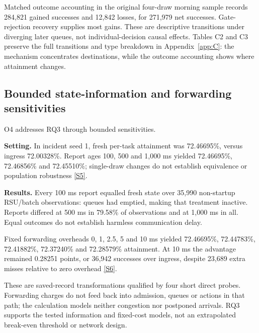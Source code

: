\documentclass[12pt,a4paper]{article}
\begin{document}
Matched outcome accounting in the original four-draw morning sample records 284,821 gained successes and 12,842 losses, for 271,979 net successes. Gate-rejection recovery supplies most gains. These are descriptive transitions under diverging later queues, not individual-decision causal effects. Tables C2 and C3 preserve the full transitions and type breakdown in Appendix~\ref{app:C}: the mechanism concentrates destinations, while the outcome accounting shows where attainment changes.

\FloatBarrier
\subsection{Bounded state-information and forwarding sensitivities}\label{sec:3.6}

O4 addresses RQ3 through bounded sensitivities.

\textbf{Setting.} In incident seed 1, fresh per-task attainment was 72.46695\%, versus ingress 72.00328\%. Report ages 100, 500 and 1,000 ms yielded 72.46695\%, 72.46856\% and 72.45510\%; single-draw changes do not establish equivalence or population robustness \hyperref[source-s5]{[S5]}.

\textbf{Results.} Every 100 ms report equalled fresh state over 35,990 non-startup RSU/batch observations: queues had emptied, making that treatment inactive. Reports differed at 500 ms in 79.58\% of observations and at 1,000 ms in all.  Equal outcomes do not establish harmless communication delay.

Fixed forwarding overheads 0, 1, 2.5, 5 and 10 ms yielded 72.46695\%, 72.44783\%, 72.41882\%, 72.37240\% and 72.28579\% attainment. At 10 ms the advantage remained 0.28251 points, or 36,942 successes over ingress, despite 23,689 extra misses relative to zero overhead \hyperref[source-s6]{[S6]}.

These are saved-record transformations qualified by four short direct probes. Forwarding charges do not feed back into admission, queues or actions in that path; the calculation models neither congestion nor postponed arrivals. RQ3 supports the tested information and fixed-cost models, not an extrapolated break-even threshold or network design.
\end{document}

